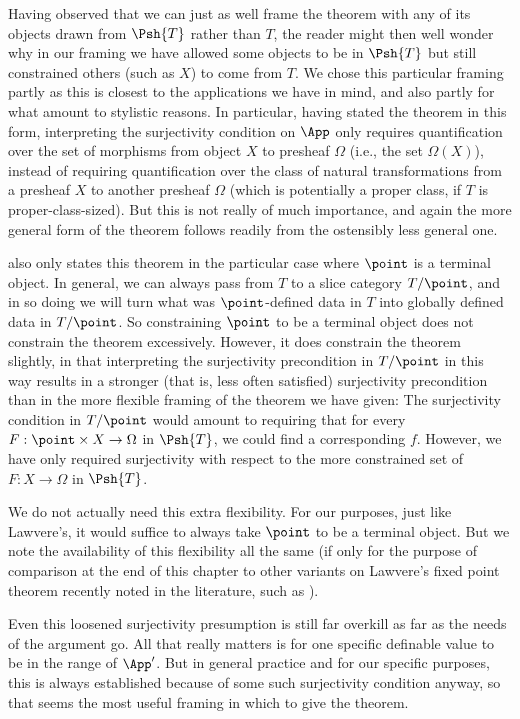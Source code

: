 Having observed that we can just as well frame the theorem with any of its objects drawn from $\Psh{T}$ rather than $T$, the reader might then well wonder why in our framing we have allowed some objects to be in $\Psh{T}$ but still constrained others (such as $X$) to come from $T$. We chose this particular framing partly as this is closest to the applications we have in mind, and also partly for what amount to stylistic reasons. In particular, having stated the theorem in this form, interpreting the surjectivity condition on $\App$ only requires quantification over the set of morphisms from object $X$ to presheaf $\Omega$ (i.e., the set $\Omega(X)$), instead of requiring quantification over the class of natural transformations from a presheaf $X$ to another presheaf $\Omega$ (which is potentially a proper class, if $T$ is proper-class-sized). But this is not really of much importance, and again the more general form of the theorem follows readily from the ostensibly less general one.

\autocite{lawvere1969diagonal} also only states this theorem in the particular case where $\point$ is a terminal object. In general, we can always pass from $T$ to a slice category $T/\point$, and in so doing we will turn what was $\point$-defined data in $T$ into globally defined data in $T/\point$. So constraining $\point$ to be a terminal object does not constrain the theorem excessively. However, it does constrain the theorem slightly, in that interpreting the surjectivity precondition in $T/\point$ in this way results in a stronger (that is, less often satisfied) surjectivity precondition than in the more flexible framing of the theorem we have given: The surjectivity condition in $T/\point$ would amount to requiring that for every $F : \point \times X \to \Omega$ in $\Psh{T}$, we could find a corresponding $f$. However, we have only required surjectivity with respect to the more constrained set of $F : X \to \Omega$ in $\Psh{T}$.

We do not actually need this extra flexibility. For our purposes, just like Lawvere's, it would suffice to always take $\point$ to be a terminal object. But we note the availability of this flexibility all the same (if only for the purpose of comparison at the end of this chapter to other variants on Lawvere's fixed point theorem recently noted in the literature, such as ).

Even this loosened surjectivity presumption is still far overkill as far as the needs of the argument go. All that really matters is for one specific definable value to be in the range of $\App'$. But in general practice and for our specific purposes, this is always established because of some such surjectivity condition anyway, so that seems the most useful framing in which to give the theorem.


